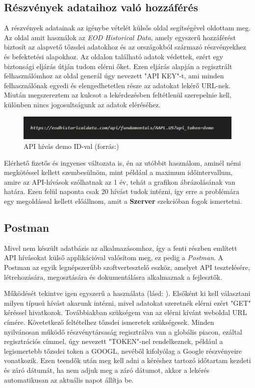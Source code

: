 \subsection{Részvények adataihoz való hozzáférés}

A részvények adatainak az igénybe vételét külsős oldal segítségével oldottam meg. Az oldal amit használok az \emph{EOD Historical Data}, amely egyszerű hozzáférést biztosít az alapvető tőzsdei adatokhoz és az országokból származó részvényekhez és befektetési alapokhoz. Az oldalon található adatok védettek, ezért egy biztonsági eljárás útján tudom elérni őket. Ezen eljárás alapján a regisztrált felhasználómhoz az oldal generál úgy nevezett "API KEY"-t, ami minden felhasználónak egyedi és elengedhetetlen része az adatokat lekérő URL-nek. Miután megszereztem az kulcsot a lekérdezésben feltétlenül szerepelnie kell, különben nincs jogosultságunk az adatok eléréséhez.  \cite{eod} \\

\begin{figure}[h]
\centering
\includegraphics[scale=0.9]{images/demoAPI.png}
\caption{API hívás demo ID-val (forrás:\cite{eod})}
\end{figure}

\pagebreak
	Elérhető fizetős és ingyenes változata is, én az utóbbit használom, aminél némi megkötéssel kellett szembesülnöm, mint például a maximum időintervallum, amire az API-hívások szólhatnak az 1 év, tehát a grafikon ábrázolásának van határa. Ezen felül naponta csak 20 hívást tudok intézni, így erre a problémára egy megoldással kellett előállnom, amit a  \textbf{Szerver} szekcióban fogok ismertetni.

\subsection{Postman}

Mivel nem készült adatbázis az alkalmazásomhoz, így a fenti részben említett API hívásokat külső applikációval valósítom meg, ez pedig a \emph{Postman}. A Postman az egyik legnépszerűbb szoftvertesztelő eszköz, amelyet API tesztelésére, létrehozására, megosztására és dokumentálásra alkalmaznak a fejlesztők. 

	Működését tekintve igen egyszerű a használata (lásd: ). Elsőként ki kell választani milyen típusú hívást akarunk intézni, mivel adatokat szeretnék elérni ezért "GET" kéréssel hivatkozok. Továbbiakban szükségem van az elérni kívánt weboldal URL címére. Követetkező feltételhez tőzsdei ismeretek szükségesek. Minden nyilvánosan működő részvénytársaság regisztrálva van a globális piacon, ezáltal regisztrációs címmel, úgy nevezett "TOKEN"-nel rendelkeznek, például a legismertebb tőzsdei token a GOOGL, nevéből kifolyólag a Google részvényeire vonatkozik. Ezen teendők után meg kell adni a kéréshez tartozó időtartam kezdeti és záró dátumát, ha nem adjuk meg a záró dátumot, akkor a lekérés automatikusan az aktuális napot állítja be. 

